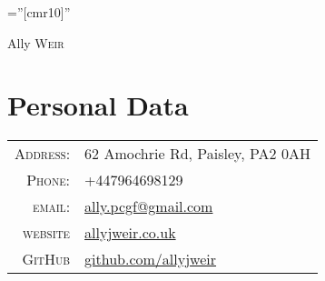 \documentclass[a4paper,10pt]{article}
\begin{document}

\pagestyle{empty} %

\font\fb=''[cmr10]'' %

\par{\centering
		{\Huge Ally \textsc{Weir}
	}\bigskip\par}

\section{Personal Data}

\begin{tabular}{rl}
    \textsc{Address:}   & 62 Amochrie Rd, Paisley, PA2 0AH \\
    \textsc{Phone:}     & +447964698129\\
    \textsc{email:}     & \href{mailto:ally.pcgf+intern@gmail.com}{ally.pcgf@gmail.com} \\
    \textsc{website}    & \href{http://www.allyjweir.co.uk}{allyjweir.co.uk} \\
    \textsc{GitHub}     & \href{http://www.github.com/allyjweir}{github.com/allyjweir}
\end{tabular}

\end{document}
